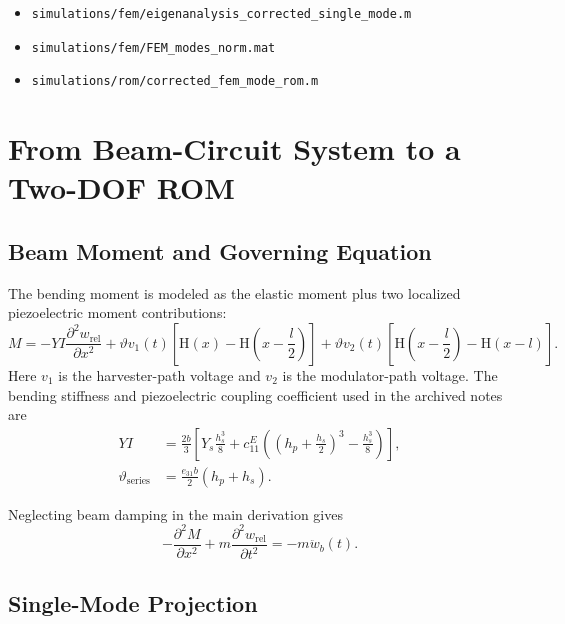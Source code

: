 \documentclass[11pt]{article}
\newcommand{\Heav}{\mathrm{H}}
\begin{document}
\begin{itemize}
  \item \texttt{simulations/fem/eigenanalysis\_corrected\_single\_mode.m}
  \item \texttt{simulations/fem/FEM\_modes\_norm.mat}
  \item \texttt{simulations/rom/corrected\_fem\_mode\_rom.m}
\end{itemize}

\section{From Beam-Circuit System to a Two-DOF ROM}

\subsection{Beam Moment and Governing Equation}

The bending moment is modeled as the elastic moment plus two localized
piezoelectric moment contributions:
\begin{equation}
  M =
  -YI\frac{\partial^2 w_{\mathrm{rel}}}{\partial x^2}
  +\vartheta v_1(t)
    \left[\Heav(x)-\Heav\!\left(x-\frac{l}{2}\right)\right]
  +\vartheta v_2(t)
    \left[\Heav\!\left(x-\frac{l}{2}\right)-\Heav(x-l)\right].
\end{equation}
Here $v_1$ is the harvester-path voltage and $v_2$ is the modulator-path
voltage.  The bending stiffness and piezoelectric coupling coefficient used in
the archived notes are
\begin{align}
  YI &=
  \frac{2b}{3}\left[
    Y_s\frac{h_s^3}{8}
    +c_{11}^{E}\left(\left(h_p+\frac{h_s}{2}\right)^3-\frac{h_s^3}{8}\right)
  \right],\\
  \vartheta_{\mathrm{series}}
  &= \frac{e_{31}b}{2}(h_p+h_s).
\end{align}

Neglecting beam damping in the main derivation gives
\begin{equation}
  -\frac{\partial^2 M}{\partial x^2}
  +m\frac{\partial^2 w_{\mathrm{rel}}}{\partial t^2}
  =
  -m\ddot w_b(t).
\end{equation}

\subsection{Single-Mode Projection}
\end{document}
